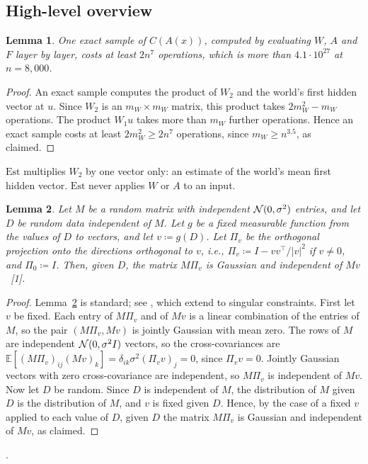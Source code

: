 \documentclass[10pt]{article}
\newcommand{\leanmark}[1]{{\relscale{0.78}\color{gray}[#1]}}
\newenvironment{leanitems}{\par\smallskip\relscale{0.78}\color{gray}\hypersetup{urlcolor=gray}\raggedright%
  \begin{list}{}{\setlength{\leftmargin}{2em}\setlength{\labelwidth}{1.6em}%
  \setlength{\labelsep}{0.4em}\setlength{\itemsep}{0pt}\setlength{\topsep}{0pt}%
  \setlength{\parsep}{0pt}}}{\end{list}\par\medskip}
\newtheorem{lemma}{Lemma}
\newcommand{\Est}{\mathrm{Est}}
\newcommand{\EE}{\mathbb{E}}
\begin{document}
\subsection{High-level overview}
\begin{lemma}\label{lem:samplecost}
One exact sample of $C(A(x))$, computed by evaluating $W$, $A$ and $F$ layer by
layer, costs at least $2n^7$ operations, which is more
than $4.1\cdot10^{27}$ at $n=8{,}000$.
\end{lemma}
\begin{proof}
An exact sample computes the product of $W_2$ and the world's first hidden
vector at $u$. Since $W_2$ is an $m_W\times m_W$ matrix, this product takes
$2m_W^2-m_W$ operations. The product $W_1u$ takes more than $m_W$ further
operations. Hence an exact sample costs at least $2m_W^2\ge2n^7$
operations, since $m_W\ge n^{3.5}$, as claimed.
\end{proof}
$\Est$ multiplies $W_2$ by one vector only: an estimate of the world's mean first
hidden vector. $\Est$ never applies $W$ or $A$ to an input.

\begin{lemma}\label{lem:gauss}
Let $M$ be a random matrix with independent $\mathcal{N}(0,\sigma^2)$ entries, and let
$D$ be random data independent of $M$. Let $g$ be a fixed measurable function
from the values of $D$ to vectors, and let $v\coloneqq g(D)$. Let $\Pi_v$ be the orthogonal
projection onto the directions orthogonal to $v$, i.e.,
$\Pi_v\coloneqq I-vv^\top/|v|^2$ if $v\ne0$, and $\Pi_0\coloneqq I$. Then, given
$D$, the matrix $M\Pi_v$ is Gaussian and independent of $Mv$~\leanmark{1}.
\end{lemma}
\begin{proof}
Lemma~\ref{lem:gauss} is standard; see \citet[arXiv v3, Lemmas~G.6--G.7]{yang-2019-tp1},
which extend \citet[arXiv v4, Lemmas~11--12]{bayati-montanari-2011} to singular constraints. First let $v$ be fixed. Each entry of $M\Pi_v$ and of $Mv$ is a
linear combination of the entries of $M$, so the pair $(M\Pi_v,Mv)$ is
jointly Gaussian with mean zero. The rows of $M$ are independent
$\mathcal{N}(0,\sigma^2I)$ vectors, so the cross-covariances are
$\EE[(M\Pi_v)_{ij}(Mv)_k]=\delta_{ik}\sigma^2(\Pi_vv)_j=0$, since
$\Pi_vv=0$. Jointly Gaussian vectors with zero cross-covariance are
independent, so $M\Pi_v$ is independent of $Mv$. Now let $D$ be random.
Since $D$ is independent of $M$, the distribution of $M$ given $D$ is the
distribution of $M$, and $v$ is fixed given $D$. Hence, by the case of a fixed $v$ applied to
each value of $D$, given $D$ the matrix $M\Pi_v$ is Gaussian and
independent of $Mv$, as claimed.
\end{proof}
\begin{leanitems}
.
\end{leanitems}
\end{document}
